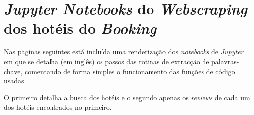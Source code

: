 \chapter{\textit{Jupyter Notebooks} do \textit{Webscraping} dos hotéis do \textit{Booking}}
\label{ap4}


Nas paginas seguintes está incluída uma renderização dos \textit{notebooks} de \textit{Jupyter} em que se detalha (em inglês) os passos das rotinas de extracção de palavras-chave, comentando de forma simples o funcionamento das funções de código usadas.

O primeiro detalha a busca dos hotéis e o segundo apenas os \textit{reviews} de cada um dos hotéis encontrados no primeiro.


